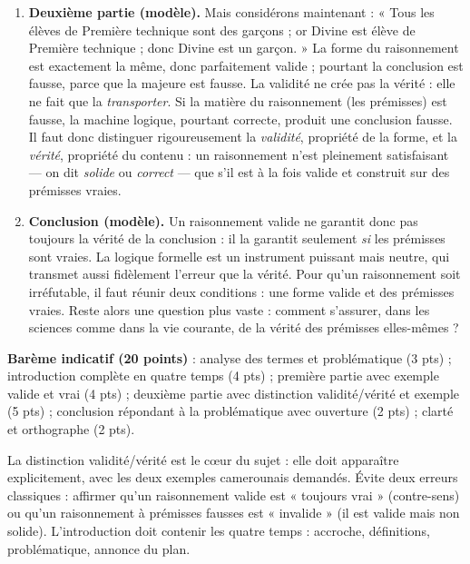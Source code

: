 \documentclass[11pt]{article}
\newcommand{\cle}[1]{{\popxbold\color{popdark}#1}}
\begin{document}
\begin{corrige}
\begin{enumerate}
\item \textbf{Deuxième partie (modèle).} Mais considérons maintenant : « Tous les élèves de Première technique sont des garçons ; or Divine est élève de Première technique ; donc Divine est un garçon. » La forme du raisonnement est exactement la même, donc parfaitement valide ; pourtant la conclusion est fausse, parce que la majeure est fausse. La validité ne crée pas la vérité : elle ne fait que la \emph{transporter}. Si la matière du raisonnement (les prémisses) est fausse, la machine logique, pourtant correcte, produit une conclusion fausse. Il faut donc distinguer rigoureusement la \emph{validité}, propriété de la forme, et la \emph{vérité}, propriété du contenu : un raisonnement n'est pleinement satisfaisant — on dit \emph{solide} ou \emph{correct} — que s'il est à la fois valide et construit sur des prémisses vraies.
\item \textbf{Conclusion (modèle).} Un raisonnement valide ne garantit donc pas toujours la vérité de la conclusion : il la garantit seulement \emph{si} les prémisses sont vraies. La logique formelle est un instrument puissant mais neutre, qui transmet aussi fidèlement l'erreur que la vérité. Pour qu'un raisonnement soit irréfutable, il faut réunir deux conditions : une forme valide et des prémisses vraies. Reste alors une question plus vaste : comment s'assurer, dans les sciences comme dans la vie courante, de la vérité des prémisses elles-mêmes ?
\end{enumerate}
\textbf{Barème indicatif (20 points)} : analyse des termes et problématique (3 pts) ; introduction complète en quatre temps (4 pts) ; première partie avec exemple valide et vrai (4 pts) ; deuxième partie avec distinction validité/vérité et exemple (5 pts) ; conclusion répondant à la problématique avec ouverture (2 pts) ; clarté et orthographe (2 pts).
\end{corrige}

\begin{attention}
La distinction \cle{validité}/\cle{vérité} est le cœur du sujet : elle doit apparaître explicitement, avec les deux exemples camerounais demandés. Évite deux erreurs classiques : affirmer qu'un raisonnement valide est « toujours vrai » (contre-sens) ou qu'un raisonnement à prémisses fausses est « invalide » (il est valide mais non solide). L'introduction doit contenir les quatre temps : accroche, définitions, problématique, annonce du plan.
\end{attention}

\newpage
\end{document}
